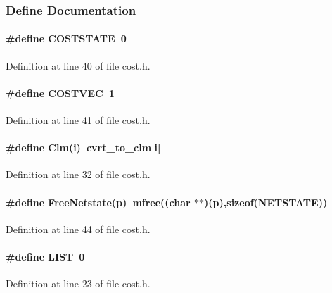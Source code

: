 \subsubsection{Define Documentation}
\label{cost.h_a5}
\paragraph{\setlength{\rightskip}{0pt plus 5cm}\#define COSTSTATE\ 0}\hfill



Definition at line 40 of file cost.h.\label{cost.h_a6}
\paragraph{\setlength{\rightskip}{0pt plus 5cm}\#define COSTVEC\ 1}\hfill



Definition at line 41 of file cost.h.\label{cost.h_a4}
\paragraph{\setlength{\rightskip}{0pt plus 5cm}\#define Clm(i)\ {\bf cvrt\_\-to\_\-clm}[i]}\hfill



Definition at line 32 of file cost.h.\label{cost.h_a8}
\paragraph{\setlength{\rightskip}{0pt plus 5cm}\#define Free\-Netstate(p)\ mfree((char $\ast$$\ast$)(p),sizeof({\bf NETSTATE}))}\hfill



Definition at line 44 of file cost.h.\label{cost.h_a0}
\paragraph{\setlength{\rightskip}{0pt plus 5cm}\#define LIST\ 0}\hfill



Definition at line 23 of file cost.h.\label{cost.h_a2}
